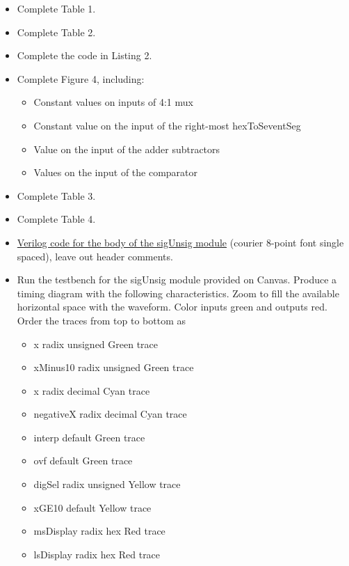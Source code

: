 \begin{itemize}
\item
  Complete Table 1.
\item
  Complete Table 2.
\item
  Complete the code in Listing 2.
\item
  Complete Figure 4, including:

  \begin{itemize}
  \item
    Constant values on inputs of 4:1 mux
  \item
    Constant value on the input of the right-most hexToSeventSeg
  \item
    Value on the input of the adder subtractors
  \item
    Values on the input of the comparator
  \end{itemize}
\item
  Complete Table 3.
\item
  Complete Table 4.
\item
  \protect\hyperlink{sigUnsign_Verilog}{Verilog code for the body of the
  sigUnsig module} (courier 8-point font single spaced), leave out
  header comments.
\item
  Run the testbench for the sigUnsig module provided on Canvas. Produce
  a timing diagram with the following characteristics. Zoom to fill the
  available horizontal space with the waveform. Color inputs green and
  outputs red. Order the traces from top to bottom as

  \begin{itemize}
  \item
    x radix unsigned Green trace
  \item
    xMinus10 radix unsigned Green trace
  \item
    x radix decimal Cyan trace
  \item
    negativeX radix decimal Cyan trace
  \item
    interp default Green trace
  \item
    ovf default Green trace
  \item
    digSel radix unsigned Yellow trace
  \item
    xGE10 default Yellow trace
  \item
    msDisplay radix hex Red trace
  \item
    lsDisplay radix hex Red trace
  \end{itemize}
\end{itemize}

